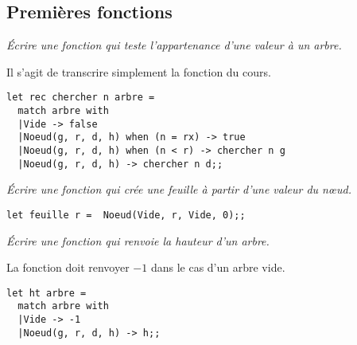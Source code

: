 \subsection{Premières fonctions}
\begin{Exercise}\it 
Écrire une fonction qui teste l'appartenance d'une valeur à un arbre.

Il s'agit de transcrire simplement la fonction du cours.
\end{Exercise}
\begin{Answer} 
\begin{lstlisting}
let rec chercher n arbre = 
  match arbre with
  |Vide -> false
  |Noeud(g, r, d, h) when (n = rx) -> true
  |Noeud(g, r, d, h) when (n < r) -> chercher n g
  |Noeud(g, r, d, h) -> chercher n d;;
\end{lstlisting}
\end{Answer}
\begin{Exercise}\it 
Écrire une fonction qui crée une feuille à partir d'une valeur du nœud.
\end{Exercise}
\begin{Answer} 
\begin{lstlisting}
let feuille r =  Noeud(Vide, r, Vide, 0);;
\end{lstlisting}
\end{Answer}
\begin{Exercise}\it 
Écrire une fonction  qui renvoie la hauteur d'un arbre.

La fonction doit renvoyer $-1$ dans le cas d'un arbre vide.
\end{Exercise}
\begin{Answer} 
\begin{lstlisting}
let ht arbre = 
  match arbre with
  |Vide -> -1
  |Noeud(g, r, d, h) -> h;;
\end{lstlisting}
\end{Answer}
